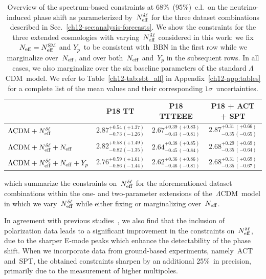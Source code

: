 \begin{table}
	\centering
	\begin{tabular}{l c c c}
			\toprule
															& P18 TT										& P18 TTTEEE									& P18 + ACT + SPT								\\
			\midrule[0.065em]
		$\Lambda\mathrm{CDM} + N_\mathrm{eff}^{\delta\ell}$ 				& $2.87^{+0.54\, (+1.37)}_{-0.73\, (-1.26)}$	& $2.67^{+0.39\, (+0.83)}_{-0.43\, (-0.81)}$	& $2.87^{+0.31\, (+0.66)}_{-0.35\, (-0.65)}$	\\[4pt]
		$\Lambda\mathrm{CDM} + N_\mathrm{eff}^{\delta\ell} + N_\mathrm{eff}$ 		& $2.82^{+0.58\, (+1.49)}_{-0.82\, (-1.35)}$	& $2.64^{+0.38\, (+0.85)}_{-0.45\, (-0.84)}$	& $2.68^{+0.29\, (+0.69)}_{-0.35\, (-0.64)}$	\\[4pt]
		$\Lambda\mathrm{CDM} + N_\mathrm{eff}^{\delta\ell} + N_\mathrm{eff} + Y_p$	& $2.76^{+0.59\, (+1.61)}_{-0.86\, (-1.44)}$	& $2.62^{+0.36\, (+0.86)}_{-0.46\, (-0.81)}$	& $2.68^{+0.31\, (+0.69)}_{-0.35\, (-0.67)}$	\\[2pt]
			\bottomrule
	\end{tabular}
	\caption[Spectrum-based constraints on the neutrino-induced phase shift]{Overview of the spectrum-based constraints at 68\%~(95\%)~c.l.\ on the neutrino-induced phase shift as parameterized by~$N_\mathrm{eff}^{\delta\ell}$ for the three dataset combinations described in Sec.~\ref{ch12-sec:analysis-forecasts}. We show the constraints for the three extended cosmologies with varying~$N_\mathrm{eff}^{\delta\ell}$ considered in this work: we fix $N_\mathrm{eff} = N_\mathrm{eff}^\mathrm{SM}$ and $Y_p$~to be consistent with~BBN in the first row while we marginalize over~$N_\mathrm{eff}$, and over both~$N_\mathrm{eff}$ and~$Y_p$ in the subsequent rows. In all cases, we also marginalize over the six baseline parameters of the standard $\Lambda$CDM~model. We refer to Table~\ref{ch12-tab:sbt_all} in Appendix~\ref{ch12-app:tables} for a complete list of the mean values and their corresponding $1\sigma$~uncertainties.}
	\label{ch12-tab:N_deltaell_analysis}
\end{table}
which summarize the constraints on~$N_\mathrm{eff}^{\delta\ell}$ for the aforementioned dataset combinations within the one- and two-parameter extensions of the~$\Lambda$CDM~model in which we vary~$N_\mathrm{eff}^{\delta\ell}$ while either fixing or marginalizing over~$N_\mathrm{eff}$.

In agreement with previous studies~\cite{Baumann:2015rya, Brust:2017nmv, Kreisch:2019yzn, Forastieri:2019cuf, Blinov:2020hmc, Das:2020xke, Brinckmann:2020bcn}, we also find that the inclusion of polarization data leads to a significant improvement in the constraints on~$N_\mathrm{eff}^{\delta\ell}$, due to the sharper E-mode peaks which enhance the detectability of the phase shift. When we incorporate data from ground-based experiments, namely~ACT and~SPT, the obtained constraints sharpen by an additional 25\%~in precision, primarily due to the measurement of higher multipoles.

